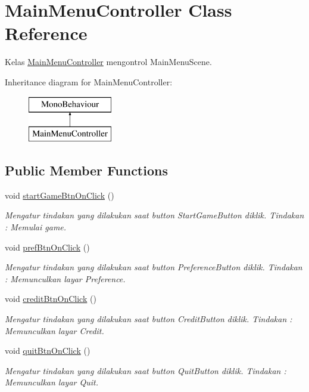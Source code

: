 \hypertarget{class_main_menu_controller}{}\section{Main\+Menu\+Controller Class Reference}
\label{class_main_menu_controller}


Kelas \hyperlink{class_main_menu_controller}{Main\+Menu\+Controller} mengontrol Main\+Menu\+Scene.  


Inheritance diagram for Main\+Menu\+Controller\+:\begin{figure}[H]
\begin{center}
\leavevmode
\includegraphics[height=2.000000cm]{class_main_menu_controller}
\end{center}
\end{figure}
\subsection*{Public Member Functions}
\begin{DoxyCompactItemize}
\item 
void \hyperlink{class_main_menu_controller_a3093b0f91bebcc757bd100be4ec19951}{start\+Game\+Btn\+On\+Click} ()
\begin{DoxyCompactList}\small\item\em Mengatur tindakan yang dilakukan saat button Start\+Game\+Button diklik. Tindakan \+: Memulai game. \end{DoxyCompactList}\item 
void \hyperlink{class_main_menu_controller_a4d4f79fdc5194e108997fb2b034bc144}{pref\+Btn\+On\+Click} ()
\begin{DoxyCompactList}\small\item\em Mengatur tindakan yang dilakukan saat button Preference\+Button diklik. Tindakan \+: Memunculkan layar Preference. \end{DoxyCompactList}\item 
void \hyperlink{class_main_menu_controller_a62a67c2d468bf4b4b45b1eefac4e08e0}{credit\+Btn\+On\+Click} ()
\begin{DoxyCompactList}\small\item\em Mengatur tindakan yang dilakukan saat button Credit\+Button diklik. Tindakan \+: Memunculkan layar Credit. \end{DoxyCompactList}\item 
void \hyperlink{class_main_menu_controller_a55f91b182c0d99e5697dd8a45aafb82b}{quit\+Btn\+On\+Click} ()
\begin{DoxyCompactList}\small\item\em Mengatur tindakan yang dilakukan saat button Quit\+Button diklik. Tindakan \+: Memunculkan layar Quit. \end{DoxyCompactList}\end{DoxyCompactItemize}
